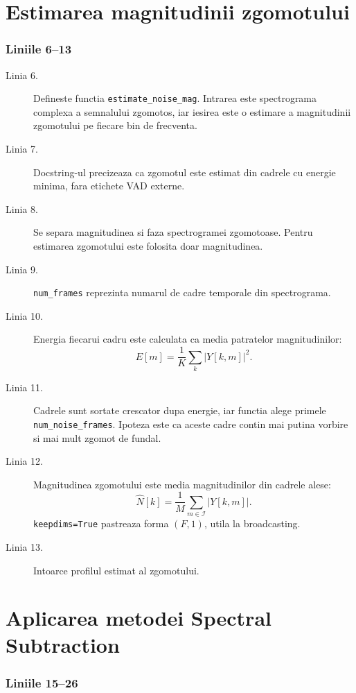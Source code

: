 \documentclass[12pt,a4paper]{report}
\newcommand{\codechunk}[2]{%
\subsection*{Liniile #1--#2}

}
\begin{document}
\chapter{Estimarea magnitudinii zgomotului}

\codechunk{6}{13}

\begin{description}
    \item[Linia 6.] Defineste functia \texttt{estimate\_noise\_mag}. Intrarea este
    spectrograma complexa a semnalului zgomotos, iar iesirea este o estimare a
    magnitudinii zgomotului pe fiecare bin de frecventa.

    \item[Linia 7.] Docstring-ul precizeaza ca zgomotul este estimat din cadrele
    cu energie minima, fara etichete VAD externe.

    \item[Linia 8.] Se separa magnitudinea si faza spectrogramei zgomotoase. Pentru
    estimarea zgomotului este folosita doar magnitudinea.

    \item[Linia 9.] \texttt{num\_frames} reprezinta numarul de cadre temporale din
    spectrograma.

    \item[Linia 10.] Energia fiecarui cadru este calculata ca media patratelor
    magnitudinilor:
    \[
    E[m] = \frac{1}{K}\sum_k |Y[k,m]|^2.
    \]

    \item[Linia 11.] Cadrele sunt sortate crescator dupa energie, iar functia alege
    primele \texttt{num\_noise\_frames}. Ipoteza este ca aceste cadre contin mai
    putina vorbire si mai mult zgomot de fundal.

    \item[Linia 12.] Magnitudinea zgomotului este media magnitudinilor din cadrele
    alese:
    \[
    \hat{N}[k] = \frac{1}{M}\sum_{m \in \mathcal{I}} |Y[k,m]|.
    \]
    \texttt{keepdims=True} pastreaza forma \((F,1)\), utila la broadcasting.

    \item[Linia 13.] Intoarce profilul estimat al zgomotului.
\end{description}

\chapter{Aplicarea metodei Spectral Subtraction}

\codechunk{15}{26}
\end{document}
